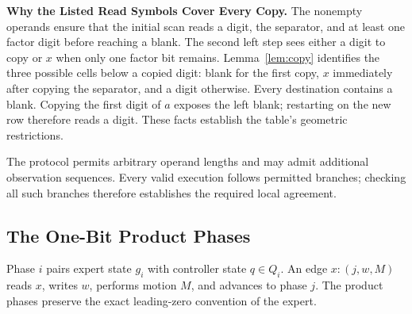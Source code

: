 \documentclass[11pt,a4paper]{article}
\begin{document}
\textbf{Why the Listed Read Symbols Cover Every Copy.}
The nonempty operands ensure that the initial scan reads a digit, the
separator, and at least one factor digit before reaching a blank. The second
left step sees either a digit to copy or $x$ when only one factor bit remains.
Lemma~\ref{lem:copy} identifies the three possible cells below a copied digit:
blank for the first copy, $x$ immediately after copying the separator, and
a digit otherwise. Every destination contains a blank. Copying the first digit of $a$
exposes the left blank; restarting on the new row therefore reads a digit.
These facts establish the table's geometric restrictions.

The protocol permits arbitrary operand lengths and may admit additional
observation sequences. Every valid execution follows permitted branches;
checking all such branches therefore establishes the required local agreement.

\newpage
\subsection{The One-Bit Product Phases}\label{sec:part4}
Phase $i$ pairs expert state $g_i$ with controller state $q\in Q_i$.
An edge $x:(j,w,M)$ reads $x$, writes $w$, performs motion $M$, and advances
to phase $j$.
The product phases preserve the exact leading-zero convention of the expert.
\end{document}
